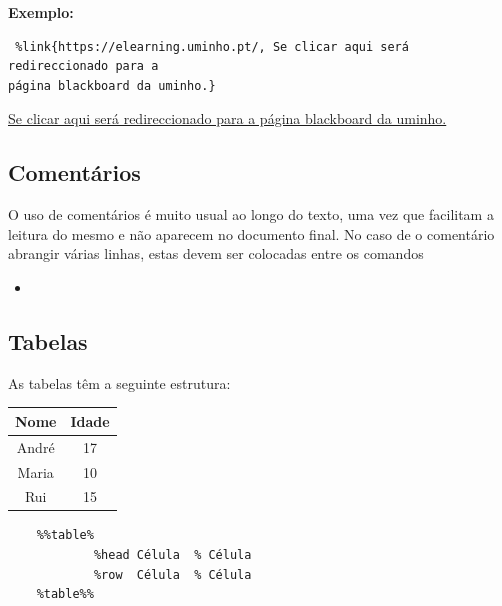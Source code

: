\documentclass[11pt,a4paper]{article}
\begin{document}
\textbf{Exemplo:} 

\begin{verbatim} %link{https://elearning.uminho.pt/, Se clicar aqui será redireccionado para a 
página blackboard da uminho.} \end{verbatim}

\href{https://elearning.uminho.pt/}{ Se clicar aqui será redireccionado para a página blackboard da uminho.}
 

\subsection{Comentários}
O uso de comentários é muito usual ao longo do texto, uma vez que facilitam a leitura do mesmo e não aparecem no documento final. No caso de o comentário abrangir várias linhas, estas devem ser colocadas entre os comandos \verb@ %%coment% e %coment%% @. Por outro lado, se o pretendido for apenas um comentário de linha, coloca-se o texto a comentar após o comando \verb@ %%% @. \\  

\begin{itemize}
    \item \verb@ %%% Isto é um comentário de linha @
\end{itemize}

 \newpage  
\subsection{Tabelas} 
As tabelas têm a seguinte estrutura:  \\  



            
            
            
            

\begin{table}[!htpb]
\centering
\begin{tabular}{||c|c||}
\hline
 \textbf{ Nome  } & \textbf{  Idade  } \\
\hline
 André   &  17  \\
\hline
 Maria  &  10 \\
\hline
 Rui  &  15 \\
\hline
\end{tabular}
\end{table}



\begin{verbatim}
    %%table%
            %head Célula  % Célula 
            %row  Célula  % Célula  
    %table%%
\end{verbatim}
\end{document}

